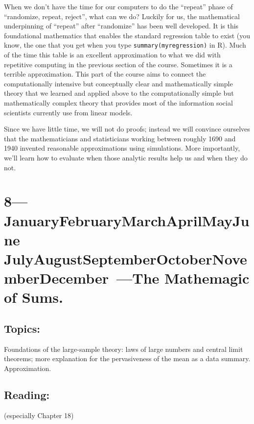 \documentclass[10pt]{article}
\def\themonth{\ifcase\month\or
  January\or February\or March\or April\or May\or June\or
  July\or August\or September\or October\or November\or December\fi}
\begin{document}
When we don't have the time for our computers to do the ``repeat''
phase of ``randomize, repeat, reject'', what can we do? Luckily for
us, the mathematical underpinning of ``repeat'' after ``randomize''
has been well developed. It is this foundational mathematics that
enables the standard regression table to exist (you know, the one that
you get when you type \texttt{summary(myregression)} in
R). Much of the time this table is an excellent approximation
to what we did with repetitive computing in the previous section of
the course. Sometimes it is a terrible approximation. This part of the
course aims to connect the computationally intensive but conceptually
clear and mathematically simple theory that we learned and applied
above to the computationally simple but mathematically complex theory
that provides most of the information social scientists currently use
from linear models.

Since we have little time, we will not do proofs; instead we will
convince ourselves that the mathematicians and statisticians working
between roughly 1690 and 1940 invented reasonable approximations using
simulations. More importantly, we'll learn how to
evaluate when those analytic results help us and when they do
not.






\AdvanceDate[7]
\section{8---\themonth~\the\day---The Mathemagic of Sums.}

\subsection{Topics:} Foundations of the large-sample theory: laws of
large numbers and central limit theorems; more explanation for the
pervasiveness of the mean as a data summary. Approximation.

\subsection{Reading:}
\citealp[Chap 16--18]{fpp07} (especially Chapter 18)
\end{document}
